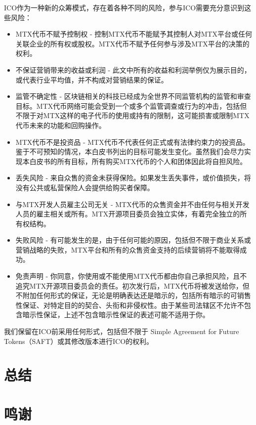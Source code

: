 \documentclass[UTF8,nofonts]{ctexart}
\begin{document}
ICO作为一种新的众筹模式，存在着各种不同的风险，参与ICO需要充分意识到这些风险：
\begin{itemize}
	\item MTX代币不赋予控制权 - 控制MTX代币不能赋予其控制人对MTX平台或任何关联企业的所有权或股权。MTX代币不赋予任何参与涉及MTX平台的决策的权利。
	\item 不保证营销带来的收益或利润 - 此文中所有的收益和利润举例仅为展示目的，或代表行业平均值，并不构成对营销结果的保证。
	\item 监管不确定性 - 区块链相关的科技已经成为全世界不同监管机构的监管和审查目标。MTX代币网络可能会受到一个或多个监管调查或行为的冲击，包括但不限于对MTX这样的电子代币的使用或持有的限制，这可能损害或限制MTX代币未来的功能和回购操作。
	\item MTX代币不是投资品 - MTX代币不代表任何正式或有法律约束力的投资品。鉴于不可预知的情况，本白皮书列出的目标可能发生变化。虽然我们会尽力实现本白皮书的所有目标，所有购买MTX代币的个人和团体因此将自担风险。
	\item 丢失风险 - 来自众售的资金未获得保险。如果发生丢失事件，或价值损失，将没有公共或私营保险人会提供给购买者保障。
	\item 与MTX开发人员雇主公司无关 - MTX代币的众售资金并不由任何与相关开发人员的雇主相关或所有。MTX开源项目委员会独立实体，有着完全独立的所有权结构。
	\item 失败风险 - 有可能发生的是，由于任何可能的原因，包括但不限于商业关系或营销战略的失败，MTX平台和所有的众售资金支持的后续营销将不能取得成功。
	\item 免责声明 - 你同意，你使用或不能使用MTX代币都由你自己承担风险，且不追究MTX开源项目委员会的责任。初次发行后，MTX代币将被发送给你，但不附加任何形式的保证，无论是明确表达还是暗示的，包括所有暗示的可销售性保证、对特定目的的契合、头衔和非侵权性。由于某些司法辖区不允许不包含暗示性保证，上述不包含暗示性保证的表述可能不适用于你。
\end{itemize}


我们保留在ICO前采用任何形式，包括但不限于 Simple Agreement for Future Tokens（SAFT）或其修改版本进行ICO的权利。

\section{总结\label{sec:summary}}

\section{鸣谢\label{sec:acknowledgement}}



\end{document}
